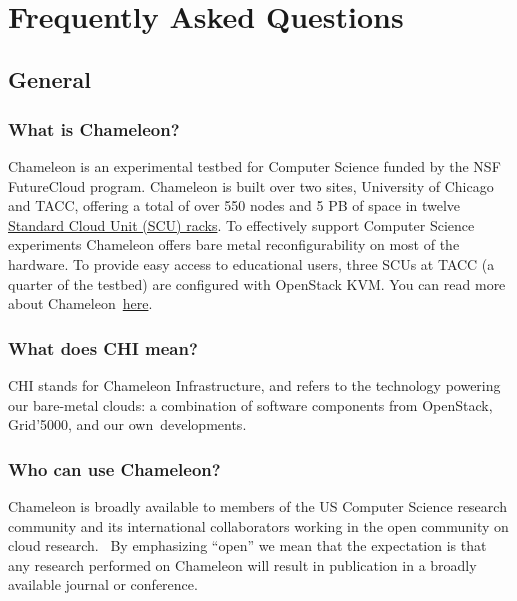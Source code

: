 \FILENAME\

\chapter{Frequently Asked Questions}\label{frequently-asked-questions}

\section{General}\label{general}

\subsection{What is Chameleon?}\label{what-is-chameleon}

Chameleon is an experimental testbed for Computer Science funded by the
NSF FutureCloud program. Chameleon is built over two sites, University
of Chicago and TACC, offering a total of over 550 nodes and 5 PB of
space in twelve
\href{https://www.chameleoncloud.org/about/hardware-description/}{Standard
Cloud Unit (SCU) racks}. To effectively support Computer Science
experiments Chameleon offers bare metal reconfigurability on most of the
hardware. To provide easy access to educational users, three SCUs at
TACC (a quarter of the testbed) are configured with OpenStack KVM. You
can read more about
Chameleon~\href{https://www.chameleoncloud.org/about/chameleon/}{here}.

\subsection{What does CHI mean?}\label{what-does-chi-mean}

CHI stands for Chameleon Infrastructure, and refers to the technology
powering our bare-metal clouds: a combination of software components
from OpenStack, Grid'5000, and our own~developments.

\subsection{Who can use Chameleon?}\label{who-can-use-chameleon}

Chameleon is broadly available to members of the US Computer Science
research community and its international collaborators working in the
open community on cloud research. ~By emphasizing ``open'' we mean that
the expectation is that any research performed on Chameleon will result
in publication in a broadly available journal or conference.~

